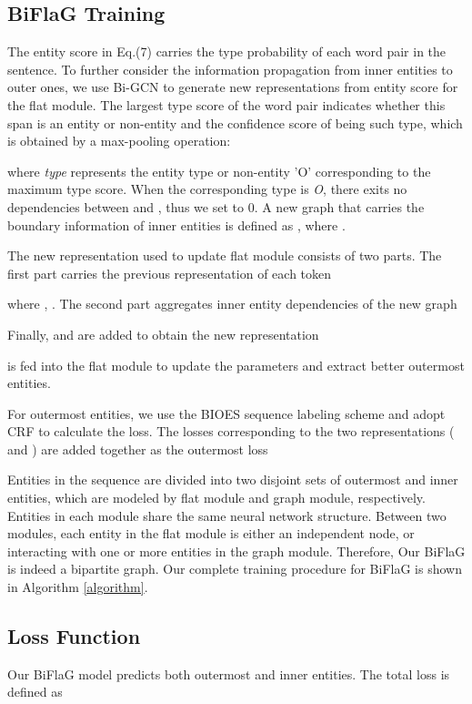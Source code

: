 \documentclass[11pt,a4paper]{article}
\begin{document}
\subsection{BiFlaG Training}
The entity score  in Eq.(7) carries the type probability of each word pair in the sentence. To further consider the information propagation from inner entities to outer ones, we use Bi-GCN to generate new representations from entity score  for the flat module. The largest type score  of the word pair  indicates  whether this span is an entity or non-entity and the confidence score of being such type, which  is obtained by a max-pooling operation:


where \textit{type} represents the entity type or non-entity 'O' corresponding to the maximum type score. 
When the corresponding type is \textit{O}, there exits no dependencies between  and , thus we set  to 0.
A new graph that carries the boundary information of inner entities is defined as , where .

 The new representation used to update flat module consists of two parts. The first part carries the previous representation of each token

where , .
The second part aggregates inner entity dependencies of the new graph 

Finally,  and  are added to obtain the new representation

  is fed into the flat module to update the parameters and extract better outermost entities.
 
 For outermost entities, we use the BIOES sequence labeling scheme and adopt CRF to calculate the loss. The losses corresponding to the two representations ( and ) are added together as the outermost loss

 
Entities in the sequence are divided into two disjoint sets of outermost and inner entities, which are modeled by flat module and graph module, respectively.
Entities in each module share the same neural network structure.
Between two modules, each entity in the flat module is either an independent node, or interacting with one or more entities in the graph module. Therefore, Our BiFlaG is indeed a bipartite graph.
Our complete training procedure for BiFlaG is shown in Algorithm \ref{algorithm}.

\subsection{Loss Function}
Our BiFlaG model predicts both outermost and inner entities. 
The total loss is defined as
\end{document}
